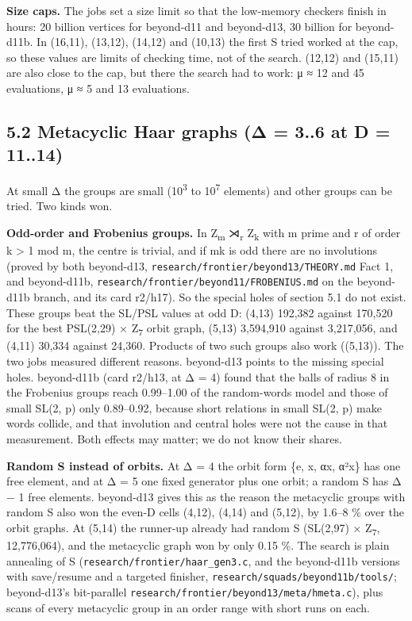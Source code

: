 \documentclass[
  10pt,
]{article}
\begin{document}
\textbf{Size caps.} The jobs set a size limit so that the low-memory checkers finish in hours: 20 billion vertices for
beyond-d11 and beyond-d13, 30 billion for beyond-d11b. In (16,11), (13,12), (14,12) and (10,13) the first S tried
worked at the cap, so these values are limits of checking time, not of the search. (12,12) and (15,11) are also close
to the cap, but there the search had to work: μ ≈ 12 and 45 evaluations, μ ≈ 5 and 13 evaluations.

\hypertarget{metacyclic-haar-graphs-ux3b4-3..6-at-d-11..14}{%
\subsection{5.2 Metacyclic Haar graphs (Δ = 3..6 at D = 11..14)}\label{metacyclic-haar-graphs-ux3b4-3..6-at-d-11..14}}

At small Δ the groups are small (10\textsuperscript{3} to 10\textsuperscript{7} elements) and other groups can be
tried. Two kinds won.

\textbf{Odd-order and Frobenius groups.} In Z\textsubscript{m} ⋊\textsubscript{r} Z\textsubscript{k} with m prime and
r of order k \textgreater{} 1 mod m, the centre is trivial, and if mk is odd there are no involutions (proved by both
beyond-d13, \texttt{research/\allowbreak{}frontier/\allowbreak{}beyond13/\allowbreak{}THEORY.md} Fact 1, and beyond-d11b,
\texttt{research/\allowbreak{}frontier/\allowbreak{}beyond11/\allowbreak{}FROBENIUS.md} on the beyond-d11b branch, and its card r2/h17). So the special holes
of section 5.1 do not exist. These groups beat the SL/PSL values at odd D: (4,13) 192,382 against 170,520 for the best
PSL(2,29) × Z\textsubscript{7} orbit graph, (5,13) 3,594,910 against 3,217,056, and (4,11) 30,334 against 24,360.
Products of two such groups also work ((5,13)). The two jobs measured different reasons. beyond-d13 points to the
missing special holes. beyond-d11b (card r2/h13, at Δ = 4) found that the balls of radius 8 in the Frobenius groups
reach 0.99--1.00 of the random-words model and those of small SL(2, p) only 0.89--0.92, because short relations in
small SL(2, p) make words collide, and that involution and central holes were not the cause in that measurement. Both
effects may matter; we do not know their shares.

\textbf{Random S instead of orbits.} At Δ = 4 the orbit form \{e, x, αx, α²x\} has one free element, and at Δ = 5 one
fixed generator plus one orbit; a random S has Δ − 1 free elements. beyond-d13 gives this as the reason the metacyclic
groups with random S also won the even-D cells (4,12), (4,14) and (5,12), by 1.6--8 \% over the orbit graphs. At
(5,14) the runner-up already had random S (SL(2,97) × Z\textsubscript{7}, 12,776,064), and the metacyclic graph won by
only 0.15 \%. The search is plain annealing of S (\texttt{research/\allowbreak{}frontier/\allowbreak{}haar\_\allowbreak{}gen3.c}, and the beyond-d11b
versions with save/resume and a targeted finisher, \texttt{research/\allowbreak{}squads/\allowbreak{}beyond11b/\allowbreak{}tools/\allowbreak{}}; beyond-d13's
bit-parallel \texttt{research/\allowbreak{}frontier/\allowbreak{}beyond13/\allowbreak{}meta/\allowbreak{}hmeta.c}), plus scans of every metacyclic group in an order range
with short runs on each.
\end{document}
